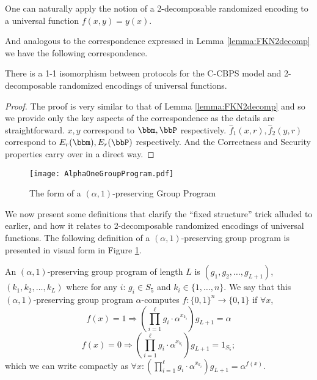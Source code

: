 One  can naturally  apply the  notion of  a  2-decomposable randomized
encoding to a universal function $f(x,y) = y(x)$.

And   analogous    to   the   correspondence    expressed   in   Lemma
\ref{lemma:FKN2decomp} we have the following correspondence.

\begin{lemma}
\label{lemma:ccbps-2decompuniv}
There is a 1-1 isomorphism  between protocols for the C-CBPS model and
2-decomposable randomized encodings of universal functions.
\end{lemma}
\begin{proof}
The proof is very similar  to that of Lemma \ref{lemma:FKN2decomp} and
so  we provide  only  the key  aspects  of the  correspondence as  the
details  are  straightforward.   $x,  y$ correspond  to  $\bbm,  \bbP$
respectively.     $\hat{f}_1(x,r),   \hat{f}_2(y,r)$    correspond   to
$E_r(\bbm), E_r(\bbP)$ respectively.  And the Correctness and Security
properties carry over in a direct way.
\end{proof} 

\begin{figure}
\centering
\texttt{[image: AlphaOneGroupProgram.pdf]}
\vspace{-.8in}
\caption{The form of a $(\alpha, 1)$-preserving Group Program}
\label{fig:alphaone}
\end{figure}


We now  present some definitions that clarify  the ``fixed structure''
trick  alluded  to  earlier,  and  how it  relates  to  2-decomposable
randomized encodings of universal functions.  The following definition
of a $(\alpha,1)$-preserving group program is presented in visual form
in Figure \ref{fig:alphaone}.

\begin{definition}
  An  $(\alpha,1)$-preserving group  program of  length $L$  is $(g_1,
  g_2,\ldots, g_{L+1})$,  $(k_1, k_2,\ldots, k_L)$ where  for any $i$:
  $g_{i} \in S_{5}$ and $k_{i}  \in \{1,\ldots,n\}$.  We say that this
  $(\alpha,1)$-preserving      group     program     $\alpha$-computes
  $f:\{0,1\}^{n} \rightarrow \{0,1\}$ if $\forall x$,
  \[      f(x)=1      \Rightarrow      (\prod      ^{\ell}      _{i=1}
  g_{i}\cdot\alpha^{x_{k_i}})g_{L+1} = \alpha \]
\[       f(x)=0      \Rightarrow      (\prod       ^{\ell}      _{i=1}
g_{i}\cdot\alpha^{x_{k_i}})g_{L+1}  =  1_{S_5}; \]  which  we can  write
compactly    as     $\forall    x    :     (\prod    ^{\ell}    _{i=1}
g_{i}\cdot\alpha^{x_{k_i}})g_{L+1} = \alpha^{f(x)}$.
\end{definition}

